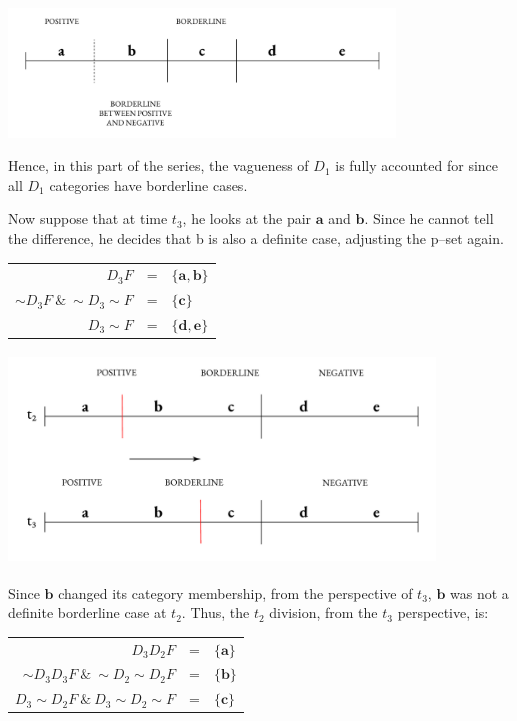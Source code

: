 \begin{center}
\includegraphics[width=0.77\textwidth]{papers/figures/2-4.pdf}
\end{center}
Hence, in this part of the series, the vagueness of \(D_{1}\) is fully
accounted for since all $D_{1}$ categories have borderline cases.

Now suppose that at time $t_{3}$, he looks at the pair $\mathbf{a}$ and
$\mathbf{b}$. Since he cannot tell the difference, he decides that b is
also a definite case, adjusting the p--set again.

\begin{center}
\begin{tabulary}{\textwidth}{RCL}
$D_3 F$ & = & $\{ \mathbf{a}, \mathbf{b} \}$ \\
${\sim} D_3F \ \& \ {\sim}D_{3}{\sim}F$ & = & $\{ \mathbf{c} \}$ \\
$D_{3}{\sim} F $ & = & $\{ \mathbf{d}, \mathbf{e} \}$
\end{tabulary}
\end{center}

\begin{center}
    \includegraphics[width=4.46286in,height=2.2071in]{papers/figures/2-5.pdf}
  \end{center}
Since $\mathbf{b}$ changed its category membership, from the perspective
of \(t_{3}\), $\mathbf{b}$ was not a definite borderline case at
\(t_{2}\). Thus, the \(t_{2}\) division, from the \(t_{3}\) perspective,
is:

\begin{center}
\begin{tabulary}{\textwidth}{RCL}
$D_3 D_2 F$ & = & $\{ \mathbf{a} \}$ \\
${\sim}D_3 D_3 F \ \& \ {\sim}D_2 {\sim}D_2 F$ & = & $\{ \mathbf{b} \}$ \\
$D_3 {\sim}D_2 F \ \& \ D_3 {\sim}D_2 {\sim}F$ & = & $\{ \mathbf{c} \}$
\end{tabulary}
\end{center}

